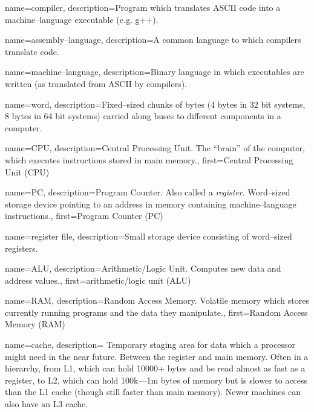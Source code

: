 
 {
    name=compiler,
    description={Program which translates ASCII code into a machine--language executable (e.g. g++).}
}

 {
    name=assembly--language,
    description={A common language to which compilers translate code.}
}

 {
    name=machine--language,
    description={Binary language in which executables are written (as translated from ASCII by compilers).}
}

 {
    name=word,
    description={Fixed--sized chunks of bytes (4 bytes in 32 bit systems, 8 bytes in 64 bit systems) carried along buses to different components in a computer.}
}

 {
    name=CPU,
    description={Central Processing Unit. The ``brain'' of the computer, which executes instructions stored in main memory.},
    first={Central Processing Unit (CPU)}
}

 {
    name=PC,
    description={Program Counter. Also called a \textit{register}. Word--sized storage device pointing to an address in memory containing machine--language instructions.},
    first={Program Counter (PC)}
}

 {
    name=register file,
    description={Small storage device consisting of word--sized registers.}
}

 {
    name=ALU,
    description={Arithmetic/Logic Unit. Computes new data and address values.},
    first={arithmetic/logic unit (ALU)}
}

 {
    name=RAM,
    description={Random Access Memory. Volatile memory which stores currently running programs and the data they manipulate.},
    first={Random Access Memory (RAM)}
}

 {
    name=cache,
    description={%
        Temporary staging area for data which a processor might need in the near future.
        Between the register and main memory.
        Often in a hierarchy, from L1, which can hold 10000+ bytes and be read almost as fast as a register, to L2, which can hold 100k---1m bytes of memory but is slower to access than the L1 cache (though still faster than main memory).
        Newer machines can also have an L3 cache.
    }
}

